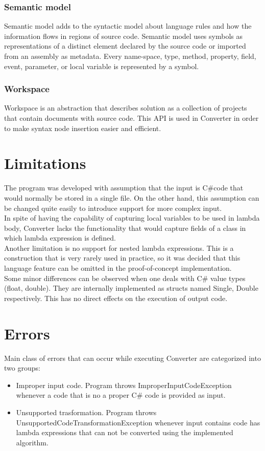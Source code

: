 \documentclass[]{report}
\begin{document}
    \subsubsection{Semantic model}
    Semantic model adds to the syntactic model about language rules and how the information flows in regions of source code. 
    Semantic model uses symbols as representations of a distinct element declared by the source code or imported from an assembly as metadata. Every name-space, type, method, property, field, event, parameter, or local variable is represented by a symbol\cite{roslynoverview}.
    
    \subsubsection{Workspace}
    Workspace is an abstraction that describes solution as a collection of projects that contain documents with source code. This API is used in Converter in order to make syntax node insertion easier and efficient.
    
    \section{Limitations}
        The program was developed with assumption that the input is C\#code that would normally be stored in a single file. On the other hand, this assumption can be changed  quite easily to introduce support for more complex input.
        \\
     In spite of having the capability of capturing local variables to be used in lambda body, Converter lacks the functionality that would capture fields of a class in which lambda expression is defined. 
     \\
     Another limitation is no support for nested lambda expressions. This is a construction that is very  rarely used in practice, so it was decided that this language feature can be omitted in the proof-of-concept implementation.
    \\
    Some minor differences can be observed when one deals with C\# value types (float, double). They are internally implemented as structs named Single, Double respectively. This has no direct effects on the execution of output code.
    \section{Errors}
    Main class of errors that can occur while executing Converter are categorized into two groups:
    \begin{itemize}
        \item Improper input code. Program throws ImproperInputCodeException whenever a code that is no a proper C\# code is provided as input.
        \item Unsupported trasformation. Program throws UnsupportedCodeTransformationException whenever input contains code has lambda expressions that can not be converted using the implemented algorithm. 
    \end{itemize}
\end{document}
